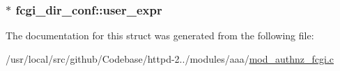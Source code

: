 \subsubsection[{\texorpdfstring{user\+\_\+expr}{user_expr}}]{$\ast$ fcgi\+\_\+dir\+\_\+conf\+::user\+\_\+expr}\hypertarget{structfcgi__dir__conf_aa2b5aef08369556dac22723054080f32}{}\label{structfcgi__dir__conf_aa2b5aef08369556dac22723054080f32}


The documentation for this struct was generated from the following file\+:\begin{DoxyCompactItemize}
\item 
/usr/local/src/github/\+Codebase/httpd-\/2../modules/aaa/\hyperlink{mod__authnz__fcgi_8c}{mod\+\_\+authnz\+\_\+fcgi.\+c}\end{DoxyCompactItemize}
